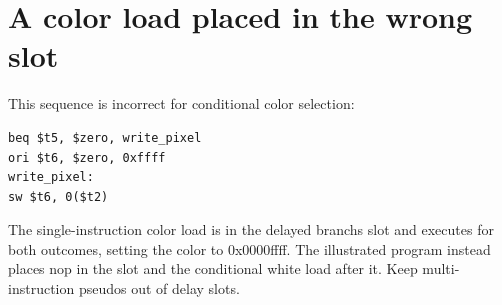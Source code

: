 \section{A color load placed in the wrong
  slot}\label{003-eight-byte-sprite-x-delay-slot-a-color-load-placed-in-the-wrong-slot}

This sequence is incorrect for conditional color selection:

\begin{verbatim}
beq $t5, $zero, write_pixel
ori $t6, $zero, 0xffff
write_pixel:
sw $t6, 0($t2)
\end{verbatim}

The single-instruction color load is in the delayed
branch\textquotesingle s slot and executes for both outcomes, setting
the color to 0x0000ffff. The illustrated program instead places nop in
the slot and the conditional white load after it. Keep multi-instruction
pseudos out of delay slots.

